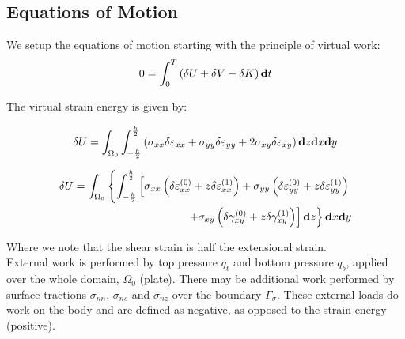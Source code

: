 \documentclass[11pt,letterpaper,titlepage,draft]{article}
\newcommand{\diff}{\textbf d}
\numberwithin{equation}{subsection}
\begin{document}
\subsection{Equations of Motion}
We setup the equations of motion starting with the principle of virtual work:
\begin{equation}\label{E:S1001:SS102:1}
0 = \int_0^T\left(\delta U + \delta V - \delta K \right) \diff{t}
\end{equation}

The virtual strain energy is given by:

\begin{align}\label{E:S1001:SS102:2}
\delta U=\int_{\Omega_0} \int_{-\frac{h}{2}}^{\frac{h}{2}} \left( \sigma_{xx} \delta \varepsilon_{xx}  + \sigma_{yy} \delta \varepsilon_{yy}  + 2\sigma_{xy} \delta \varepsilon_{xy} \right) \diff{z} \diff{x} \diff{y}
\end{align}

\begin{align}\label{E:S1001:SS102:3}
\delta U=\int_{\Omega_0} \left\{ \int_{-\frac{h}{2}}^{\frac{h}{2}} \left[ \sigma_{xx} \left( \delta\varepsilon_{xx}^{(0)} + z \delta \varepsilon_{xx}^{(1)} \right) + \sigma_{yy} \left( \delta\varepsilon_{yy}^{(0)} + z \delta \varepsilon_{yy}^{(1)} \right)\nonumber\right.\right.\nonumber\\ 
    \left.\left.+\sigma_{xy} \left( \delta\gamma_{xy}^{(0)} + z \delta \gamma_{xy}^{(1)} \right) \right] \diff{z} \right\} \diff{x} \diff{y} 
\end{align}

Where we note that the shear strain is half the extensional strain.
\\
External work is performed by top pressure $q_t$ and bottom pressure $q_b$, applied over the whole domain, $\Omega_0$ (plate). 
There may be additional work performed by surface tractions $\sigma_{nn}$, $\sigma_{ns}$ and $\sigma_{nz}$ over the 
boundary $\Gamma_{\sigma}$.  These external loads do work on the body and are defined as negative, as opposed to the 
strain energy (positive).
\end{document}
